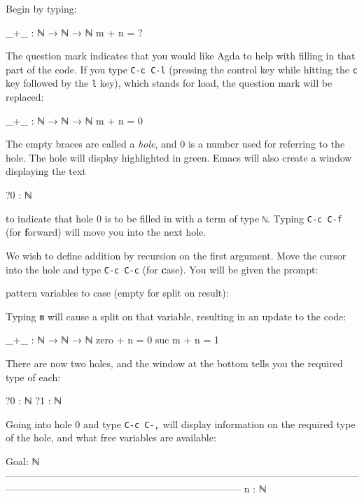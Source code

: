 Begin by typing:

\begin{myDisplay}
_+_ : ℕ → ℕ → ℕ
m + n = ?
\end{myDisplay}

The question mark indicates that you would like Agda to help with
filling in that part of the code. If you type \texttt{C-c\ C-l}
(pressing the control key while hitting the \texttt{c} key followed by
the \texttt{l} key), which stands for \textbf{l}oad, the question mark
will be replaced:

\begin{myDisplay}
_+_ : ℕ → ℕ → ℕ
m + n = { }0
\end{myDisplay}

The empty braces are called a \emph{hole}, and 0 is a number used for
referring to the hole. The hole will display highlighted in green. Emacs
will also create a window displaying the text

\begin{myDisplay}
?0 : ℕ
\end{myDisplay}

to indicate that hole 0 is to be filled in with a term of type
\texttt{ℕ}. Typing \texttt{C-c\ C-f} (for \textbf{f}orward) will move
you into the next hole.

We wish to define addition by recursion on the first argument. Move the
cursor into the hole and type \texttt{C-c\ C-c} (for \textbf{c}ase). You
will be given the prompt:

\begin{myDisplay}
pattern variables to case (empty for split on result):
\end{myDisplay}

Typing \texttt{m} will cause a split on that variable, resulting in an
update to the code:

\begin{myDisplay}
_+_ : ℕ → ℕ → ℕ
zero + n = { }0
suc m + n = { }1
\end{myDisplay}

There are now two holes, and the window at the bottom tells you the
required type of each:

\begin{myDisplay}
?0 : ℕ
?1 : ℕ
\end{myDisplay}

Going into hole 0 and type \texttt{C-c\ C-,} will display information on
the required type of the hole, and what free variables are available:

\begin{myDisplay}
Goal: ℕ
————————————————————————————————————————————————————————————
n : ℕ
\end{myDisplay}

